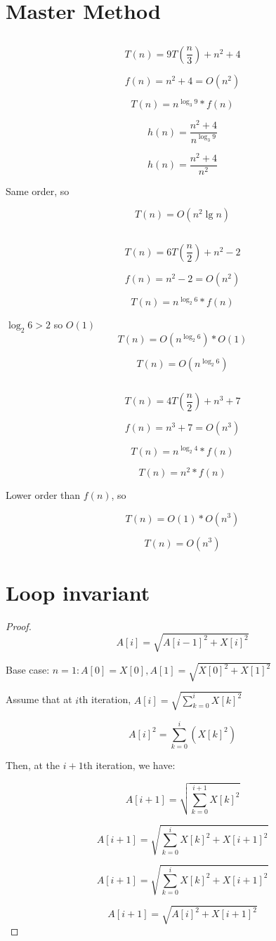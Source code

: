 \documentclass[a4paper,12pt]{article}
\begin{document}
\section{Master Method}
\subsection{}
$$T(n) = 9 T(\frac{n}{3}) + n^2 + 4$$

$$f(n) = n^2 + 4 = O(n^2)$$

$$T(n) = n^{\log_3 9} * f(n)$$

$$h(n) = \frac{n^2 + 4}{n^{\log_3 9}}$$

$$h(n) = \frac{n^2 + 4}{n^2}$$

Same order, so

$$T(n) = O(n^2\lg n)$$
\subsection{}
$$T(n) = 6 T(\frac{n}{2}) + n^2 - 2$$

$$f(n) = n^2 - 2 = O(n^2)$$

$$T(n) = n^{\log_2 6} * f(n)$$

$\log_2 6 > 2$ so $O(1)$
$$T(n) = O(n^{\log_2 6}) * O(1)$$

$$T(n) = O(n^{\log_2 6})$$

\subsection{}
$$T(n) = 4 T(\frac{n}{2}) + n^3 + 7$$

$$f(n) = n^3 + 7 = O(n^3)$$

$$T(n) = n^{\log_2 4} * f(n)$$

$$T(n) = n^2 * f(n)$$

Lower order than $f(n)$, so

$$T(n) = O(1) * O(n^3)$$

$$T(n) = O(n^3)$$

\section{Loop invariant}
\begin{proof}
$$A{[i]} = \sqrt{A{[i-1]}^2 + X{[i]}^2}$$

Base case: $n = 1: A{[0]} = X{[0]}, A{[1]} = \sqrt{X{[0]}^2 + X{[1]}^2}$

Assume that at $i$th iteration, $A[i] = \sqrt{\sum_{k=0}^{i}{X[k]^2}}$

$$A[i]^2 = \sum_{k=0}^i (X[k]^2)$$

Then, at the $i+1$th iteration, we have:

$$A[i + 1] = \sqrt{\sum_{k=0}^{i+1}{X[k]^2}}$$

$$A[i + 1] = \sqrt{\sum_{k=0}^{i}{X[k]^2} + X[i+1]^2}$$

$$A[i + 1] = \sqrt{\sum_{k=0}^{i}{X[k]^2} + X[i+1]^2}$$

$$A[i + 1] = \sqrt{A[i]^2 + X[i+1]^2}$$
\end{proof}
\end{document}
